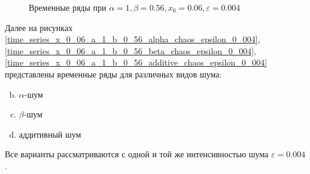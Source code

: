 \begin{figure}
        
        \caption{Временные ряды при \(\alpha = 1, \beta = 0.56, x_0 = 0.06, \varepsilon = 0.004\)}
    \end{figure}

    Далее на рисунках \ref{time_series_x_0_06_a_1_b_0_56_alpha_chaos_epsilon_0_004}, \ref{time_series_x_0_06_a_1_b_0_56_beta_chaos_epsilon_0_004}, \ref{time_series_x_0_06_a_1_b_0_56_additive_chaos_epsilon_0_004} представлены временные ряды для различных видов шума: 

    \begin{enumerate}[a)]
        \setcounter{enumi}{1}
        \item \(\alpha\)-шум
        \item \(\beta\)-шум
        \item аддитивный шум
    \end{enumerate}

    Все варианты рассматриваются с одной и той же интенсивностью шума \(\varepsilon = 0.004\). 
        
